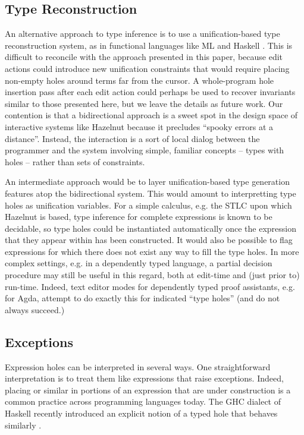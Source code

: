 \documentclass[9pt]{sigplanconf}
\begin{document}
\subsection{Type Reconstruction}
An alternative approach to type inference is to use a unification-based type reconstruction system, as in functional languages like ML and Haskell \cite{damas1982principal}. This is difficult to reconcile with the approach presented in this paper, because edit actions could introduce new  unification constraints that would require placing non-empty holes around terms far from the cursor.  A whole-program hole insertion pass after each edit action could perhaps be used to recover invariants similar to those presented here, but we leave the details as future work. Our contention is that a bidirectional approach is a sweet spot in the design space of interactive systems like Hazelnut because it precludes
``spooky errors at a distance''. Instead, the interaction is a sort of local
dialog between the programmer and the system involving simple, familiar
concepts -- types with holes -- rather than sets of constraints.


An intermediate approach would be to 
layer unification-based type generation features atop the bidirectional system. This would amount to  interpretting type holes as unification
variables. For a simple calculus,
e.g. the STLC upon which Hazelnut is based, type inference for complete expressions is known to be
decidable, so type holes could be instantiated automatically once the expression that they appear within has been constructed. It would also be possible to flag expressions for which there does not exist any way to fill the type holes. In more complex settings, e.g. in a 
dependently typed language, a partial decision procedure may still be
useful in this regard, both at edit-time and (just prior to)
run-time. Indeed, text editor modes for dependently typed proof assistants, e.g. for Agda,
attempt to do exactly this for indicated ``type holes'' (and do not always
succeed.)

\subsection{Exceptions}
Expression holes can be interpreted in several
ways. One straightforward interpretation is to treat them 
like expressions that raise exceptions. Indeed,
placing  or similar in portions of an expression
that are under construction is a common practice across programming
languages today. The GHC dialect of Haskell recently introduced an explicit notion of a 
typed hole that behaves similarly \cite{GHC/holes}. 
\end{document}
